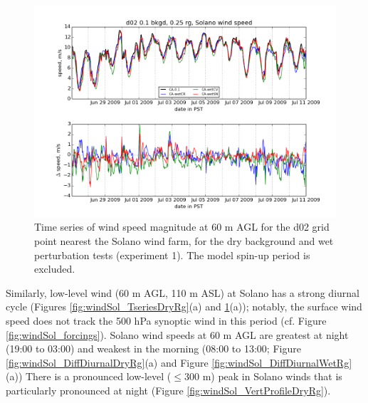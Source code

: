 \begin{figure}[here]
\includegraphics[width=1\textwidth]{ch3-wind/img/solano_wind_drybkd_wetrg_d02_level0.png}
\caption{Time series of wind speed magnitude at 60 m AGL for the d02 grid point nearest the Solano wind farm, for the dry background and wet perturbation tests (experiment 1).  The model spin-up period is excluded.}
\label{fig:windSol_TseriesWetRg}
\end{figure}

Similarly, low-level wind (60 m AGL, 110 m ASL) at Solano has a strong diurnal cycle (Figures \ref{fig:windSol_TseriesDryRg}(a) and \ref{fig:windSol_TseriesWetRg}(a)); notably, the surface wind speed does not track the 500 hPa synoptic wind in this period (cf. Figure \ref{fig:windSol_forcings}).  Solano wind speeds at 60 m AGL are greatest at night (19:00 to 03:00) and weakest in the morning (08:00 to 13:00; Figure \ref{fig:windSol_DiffDiurnalDryRg}(a) and Figure \ref{fig:windSol_DiffDiurnalWetRg}(a))  There is a pronounced low-level ($\le$300 m) peak in Solano winds that is particularly pronounced at night (Figure \ref{fig:windSol_VertProfileDryRg}).

